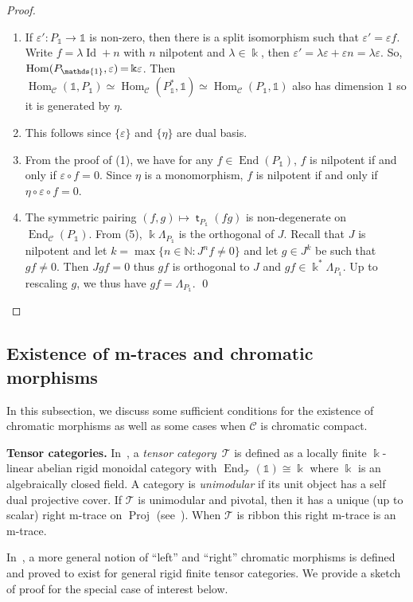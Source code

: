 \documentclass[pdftex]{sigma}
\numberwithin{equation}{section}
\newcommand{\Proj}{\operatorname{Proj}}
\newcommand{\tto}{\xrightarrow}
\numberwithin{theorem}{section}
\numberwithin{proposition}{section}
\numberwithin{definition}{section}
\numberwithin{lemma}{section}
\numberwithin{corollary}{section}
\numberwithin{remark}{section}
\numberwithin{example}{section}
\newcommand{\cat}{\mathcal{C}}
\newcommand{\ttt}{\mathcal{T}}
\newcommand{\N}{\ensuremath{\mathbb{N}}}
\newcommand{\End}{\operatorname{End}}
\newcommand{\Hom}{\operatorname{Hom}}
\newcommand{\unit}{\ensuremath{\mathds{1}}}
\newcommand{\Id}{\operatorname{Id}}
\newcommand{\FK}{{\Bbbk}}
\newcommand{\ve}{\varepsilon}
\newcommand{\mt}{{\operatorname{\mathsf{t}}}}
\begin{document}
\begin{proof}
\begin{enumerate}
 \item If $\ve'\colon P_\unit\to\unit$ is non-zero, then there is a split
 isomorphism \smash{$P_\unit\tto f P_\unit$} such that ${\ve'=\ve f}$. Write
 $f=\lambda\Id+n$ with $n$ nilpotent and $\lambda\in\FK$, then
 $\ve'=\lambda\ve+\ve n=\lambda\ve$. So,
 ${\Hom(P_\unit,\ve)\hspace{-0.9pt}=\hspace{-0.9pt}\FK\ve}$. Then
 $\Hom_\cat(\unit,P_\unit)\simeq\Hom_\cat(P_\unit^*,\unit)\simeq\Hom_\cat(P_\unit,\unit)$ also
 has dimension $1$ so it is generated by $\eta$.
 \item This follows since $\{\ve\}$ and $\{\eta\}$ are dual basis.
 \item From the proof of (1), we have for any
 $f\in\End(P_\unit)$, $f$ is nilpotent if and only if
 $\ve\circ f=0$. Since $\eta$ is a monomorphism, $f$ is nilpotent
 if and only if $\eta\circ \ve\circ f=0$.
 \item The symmetric pairing $(f,g)\mapsto \mt_{P_\unit}(fg)$ is
 non-degenerate on $\End_\cat(P_\unit)$. From (5),
 $\FK \Lambda_{P_\unit}$ is the orthogonal of $J$. Recall that $J$
 is nilpotent and let $k=\max\{n\in\N:J^nf\neq0\}$ and let
 $g\in J^k$ be such that $gf\neq0$. Then $Jgf=0$ thus $gf$ is
 orthogonal to $J$ and $gf\in\FK^* \Lambda_{P_\unit}$. Up to
 rescaling $g$, we thus have $gf=\Lambda_{P_\unit}$.
\hfill\qed
\end{enumerate}
\renewcommand{\qed}{}
\end{proof}

\subsection{Existence of m-traces and chromatic morphisms}\label{ss:coend}

 In this subsection, we discuss some sufficient conditions for the existence of chromatic morphisms as well as some cases when $\cat$ is chromatic compact.

{\bf Tensor categories.} In~\cite{EGNO}, a \emph{tensor category}~$\ttt$ is defined as a locally
finite $\FK$-linear abelian rigid monoidal category with
$\End_\ttt(\unit)\cong \FK$ where $\FK$ is an algebraically closed
field. A category is \emph{unimodular} if its unit object has a
self dual projective cover. If $\ttt$ is unimodular and pivotal, then
it has a unique (up to scalar) right m-trace on $\Proj$ (see~\cite[Corollary
5.6]{GKP22}). When $\ttt$ is ribbon this right m-trace is an m-trace.

In~\cite{CGPV2023b}, a more general notion of ``left'' and ``right'' chromatic morphisms is defined and proved to exist for general rigid finite tensor categories. We provide a sketch of proof for the special case of interest below.
\end{document}
